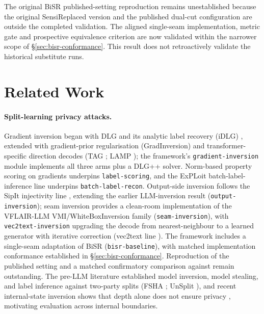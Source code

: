 \documentclass[11pt]{article}
\newcommand{\attack}[1]{\nolinkurl{#1}}
\begin{document}
The original BiSR published-setting reproduction remains unestablished because the original SensiReplaced version and the published dual-cut configuration are outside the completed validation. The aligned single-seam implementation, metric gate and prospective equivalence criterion are now validated within the narrower scope of \S\ref{sec:bisr-conformance}. This result does not retroactively validate the historical substitute runs.

\section{Related Work}
\label{sec:related}

\paragraph{Split-learning privacy attacks.}
Gradient inversion began with DLG \cite{dlg} and its analytic label recovery
(iDLG) \cite{idlg}, extended with gradient-prior regularisation
(GradInversion) \cite{gradinversion} and
transformer-specific direction decodes (TAG \cite{tag}; LAMP \cite{lamp}); the framework's
\attack{gradient-inversion} module implements all three arms plus a
DLG++ solver. Norm-based property scoring on gradients
\cite{normscore} underpins \attack{label-scoring}, and the ExPLoit
batch-label-inference line \cite{bli} underpins \attack{batch-label-recon}.
Output-side inversion follows the SipIt injectivity line
\cite{sipit}, extending the earlier LLM-inversion result
\cite{morris2024llminv} (\attack{output-inversion}); seam inversion provides a clean-room implementation of the VFLAIR-LLM
VMI/WhiteBoxInversion family \cite{vflair}
(\attack{seam-inversion}), with \attack{vec2text-inversion} upgrading the
decode from nearest-neighbour to a learned generator with iterative
correction (vec2text line \cite{vec2text}). The framework includes a single-seam adaptation of BiSR (\attack{bisr-baseline}), with matched implementation conformance established in \S\ref{sec:bisr-conformance}. Reproduction of the published setting and a matched confirmatory comparison against \cite{bisr2024} remain outstanding. The pre-LLM
literature established model inversion, model stealing, and label
inference against two-party splits (FSHA \cite{pasquini2021unleashing};
UnSplit \cite{erdogan2022unsplit}), and recent internal-state inversion
shows that depth alone does not ensure privacy \cite{dong2025depth}, motivating evaluation across internal boundaries.
\end{document}
